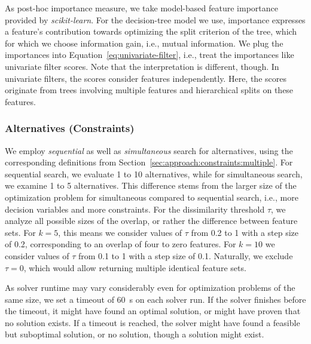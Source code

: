\documentclass{article}
\theoremstyle{definition}
\begin{document}
As post-hoc importance measure, we take model-based feature importance provided by \emph{scikit-learn}.
For the decision-tree model we use, importance expresses a feature's contribution towards optimizing the split criterion of the tree, which for which we choose information gain, i.e., mutual information.
We plug the importances into Equation~\ref{eq:univariate-filter}, i.e., treat the importances like univariate filter scores.
Note that the interpretation is different, though.
In univariate filters, the scores consider features independently.
Here, the scores originate from trees involving multiple features and hierarchical splits on these features.

\subsubsection{Alternatives (Constraints)}
\label{sec:experimental-design:approaches:alternatives}

We employ \emph{sequential} as well as \emph{simultaneous} search for alternatives, using the corresponding definitions from Section~\ref{sec:approach:constraints:multiple}.
For sequential search, we evaluate 1 to 10 alternatives, while for simultaneous search, we examine 1 to 5 alternatives.
This difference stems from the larger size of the optimization problem for simultaneous compared to sequential search, i.e., more decision variables and more constraints.
For the dissimilarity threshold $\tau$, we analyze all possible sizes of the overlap, or rather the difference between feature sets.
For $k=5$, this means we consider values of $\tau$ from 0.2 to 1 with a step size of 0.2, corresponding to an overlap of four to zero features.
For $k=10$ we consider values of $\tau$ from 0.1 to 1 with a step size of 0.1.
Naturally, we exclude $\tau = 0$, which would allow returning multiple identical feature sets.

As solver runtime may vary considerably even for optimization problems of the same size, we set a timeout of 60~s on each solver run.
If the solver finishes before the timeout, it might have found an optimal solution, or might have proven that no solution exists.
If a timeout is reached, the solver might have found a feasible but suboptimal solution, or no solution, though a solution might exist.

\end{document}
